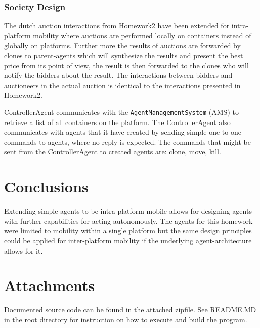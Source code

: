 \documentclass[a4paper, 11pt]{article}
\begin{document}
\subsubsection*{Society Design}
The dutch auction interactions from Homework2 have been extended for intra-platform mobility where auctions are performed locally on containers instead of globally on platforms. Further more the results of auctions are forwarded by clones to parent-agents which will synthesize the results and present the best price from its point of view, the result is then forwarded to the clones who will notify the bidders about the result. The interactions between bidders and auctioneers in the actual auction is identical to the interactions presented in Homework2.

ControllerAgent communicates with the \texttt{AgentManagementSystem} (AMS) to retrieve a list of all containers on the platform. The ControllerAgent also communicates with agents that it have created by sending simple one-to-one commands to agents, where no reply is expected. The commands that might be sent from the ControllerAgent to created agents are: clone, move, kill.
\section*{Conclusions}
Extending simple agents to be intra-platform mobile allows for designing agents with further capabilities for acting autonomously. The agents for this homework were limited to mobility within a single platform but the same design principles could be applied for inter-platform mobility if the underlying agent-architecture allows for it.

\section*{Attachments}
Documented source code can be found in the attached zipfile. See README.MD in the root directory for instruction on how to execute and build the program.

{}

\end{document}

